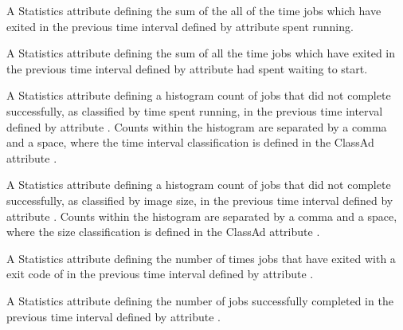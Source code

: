 \begin{description}
\item[\AdAttr{RecentJobsAccumRunningTime}:] A Statistics attribute defining
  the sum of the all of the time jobs 
  which have exited 
  in the previous time interval defined by attribute 
  spent running.

\item[\AdAttr{RecentJobsAccumTimeToStart}:] A Statistics attribute defining
  the sum of all the time jobs 
  which have exited
  in the previous time interval defined by attribute 
  had spent waiting to start.

\item[\AdAttr{RecentJobsBadputRuntimes}:] A Statistics attribute defining
  a histogram count of jobs that did not complete successfully,
  as classified by time spent running,
  in the previous time interval defined by attribute .
  Counts within the histogram are separated by a comma and a space,
  where the time interval classification is defined in the ClassAd attribute
  .

\item[\AdAttr{RecentJobsBadputSizes}:]  A Statistics attribute defining
  a histogram count of jobs that did not complete successfully,
  as classified by image size,
  in the previous time interval defined by attribute .
  Counts within the histogram are separated by a comma and a space, 
  where the size classification is defined in the ClassAd attribute
  .

\item[\AdAttr{RecentJobsCheckpointed}:] A Statistics attribute defining
  the number of times jobs that have exited 
  with a  exit code of 
  in the previous time interval defined by attribute .

\item[\AdAttr{RecentJobsCompleted}:] A Statistics attribute defining
  the number of jobs successfully completed
  in the previous time interval defined by attribute .


\end{description}
